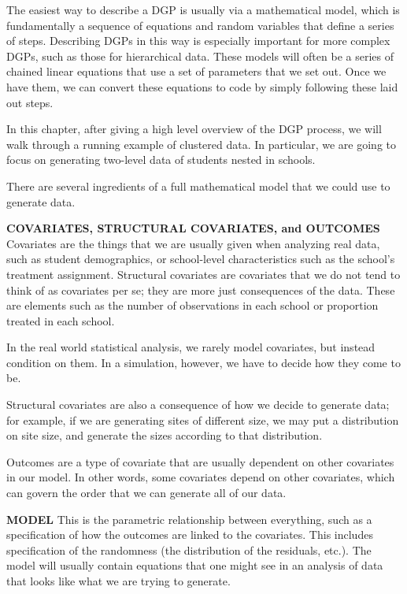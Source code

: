 \documentclass[
]{book}
\begin{document}
The easiest way to describe a DGP is usually via a mathematical model, which is fundamentally a sequence of equations and random variables that define a series of steps.
Describing DGPs in this way is especially important for more complex DGPs, such as those for hierarchical data.
These models will often be a series of chained linear equations that use a set of parameters that we set out.
Once we have them, we can convert these equations to code by simply following these laid out steps.

In this chapter, after giving a high level overview of the DGP process, we will walk through a running example of clustered data.
In particular, we are going to focus on generating two-level data of students nested in schools.

There are several ingredients of a full mathematical model that we could use to generate data.

\textbf{COVARIATES, STRUCTURAL COVARIATES, and OUTCOMES}
Covariates are the things that we are usually given when analyzing real data, such as student demographics, or school-level characteristics such as the school's treatment assignment.
Structural covariates are covariates that we do not tend to think of as covariates per se; they are more just consequences of the data.
These are elements such as the number of observations in each school or proportion treated in each school.

In the real world statistical analysis, we rarely model covariates, but instead condition on them.
In a simulation, however, we have to decide how they come to be.

Structural covariates are also a consequence of how we decide to generate data; for example, if we are generating sites of different size, we may put a distribution on site size, and generate the sizes according to that distribution.

Outcomes are a type of covariate that are usually dependent on other covariates in our model.
In other words, some covariates depend on other covariates, which can govern the order that we can generate all of our data.

\textbf{MODEL}
This is the parametric relationship between everything, such as a specification of how the outcomes are linked to the covariates.
This includes specification of the randomness (the distribution of the residuals, etc.).
The model will usually contain equations that one might see in an analysis of data that looks like what we are trying to generate.
\end{document}
